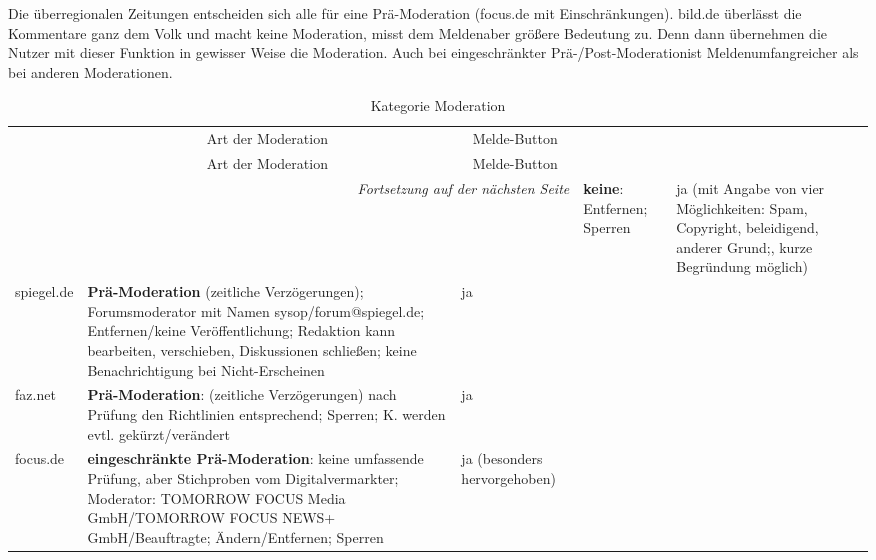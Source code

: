 Die überregionalen Zeitungen entscheiden sich alle für eine Prä-Moderation
(focus.de mit Einschränkungen). bild.de überlässt die Kommentare ganz dem Volk
und macht keine Moderation, misst dem \glqq Melden\grqq aber größere Bedeutung
zu. Denn dann übernehmen die Nutzer mit dieser Funktion in gewisser Weise die
Moderation. Auch bei \glqq eingeschränkter Prä-/Post-Moderation\grqq ist \glqq
Melden\grqq umfangreicher als bei anderen Moderationen.


\begin{landscape} \footnotesize
\begin{longtable}{lp{110mm}p{50mm}}
  \caption{Kategorie Moderation} \\ \\

  \toprule
  \multicolumn{1}{c}{} &
  \multicolumn{1}{c}{Art der Moderation} &
  \multicolumn{1}{c}{Melde-Button} \\\midrule[\heavyrulewidth]
  \endfirsthead

  \toprule
  \multicolumn{1}{c}{} &
  \multicolumn{1}{c}{Art der Moderation} &
  \multicolumn{1}{c}{Melde-Button} \\\midrule[\heavyrulewidth]
  \endhead

  \multicolumn{3}{r}{\emph{Fortsetzung auf der nächsten Seite}}
  \endfoot

  \bottomrule
  \endlastfoot

bild.de &
  {\bfseries keine}: Entfernen; Sperren &
  ja (mit Angabe von vier Möglichkeiten: Spam, Copyright, beleidigend, anderer
  Grund;, kurze Begründung möglich) \\\midrule

spiegel.de &
   {\bfseries Prä-Moderation} (zeitliche Verzögerungen); Forumsmoderator mit Namen
  sysop/forum@spiegel.de; Entfernen/keine Veröffentlichung; Redaktion kann
  bearbeiten, verschieben, Diskussionen schließen; keine Benachrichtigung bei
  Nicht-Erscheinen &
  ja \\\midrule

faz.net &
   {\bfseries Prä-Moderation}: (zeitliche Verzögerungen) nach Prüfung den Richtlinien
  entsprechend; Sperren; K. werden evtl. gekürzt/verändert &
  ja \\\midrule

focus.de &
   {\bfseries eingeschränkte Prä-Moderation}: keine umfassende Prüfung, aber Stichproben vom
  Digitalvermarkter; Moderator: TOMORROW FOCUS Media GmbH/TOMORROW FOCUS NEWS+
  GmbH/Beauftragte; Ändern/Entfernen; Sperren &
  ja (besonders hervorgehoben) \\\midrule


\end{longtable}
\end{landscape}
